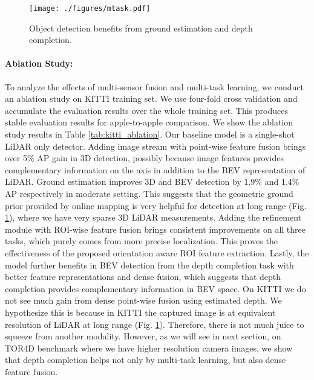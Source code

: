 \documentclass[10pt,twocolumn,letterpaper]{article}
\begin{document}
\begin{figure}[t]
\begin{center}
\texttt{[image: ./figures/mtask.pdf]}
\end{center}
   \caption{Object detection benefits from ground estimation and depth completion.}
\label{fig:mtask}
\end{figure}


\paragraph{Ablation Study:}
To analyze the effects of multi-sensor fusion and multi-task learning, we conduct an ablation study on KITTI training set. We use four-fold cross validation and accumulate the evaluation results over the whole training set. This produces stable evaluation results for apple-to-apple comparison. We show the ablation study results in Table \ref{tab:kitti_ablation}.
Our baseline model is a single-shot LiDAR only detector. Adding image stream with point-wise feature fusion brings over 5\% AP gain in 3D detection, possibly because image features provides complementary information on the  axis in addition to the BEV representation of LiDAR. 
Ground estimation improves 3D and BEV detection by 1.9\% and 1.4\% AP respectively in moderate setting. This suggests that the geometric ground prior provided by online mapping is very helpful for detection at long range (Fig. \ref{fig:mtask}), where we have very sparse 3D LiDAR measurements. 
Adding the refinement module with ROI-wise feature fusion brings consistent improvements on all three tasks, which purely comes from more precise localization. This proves the effectiveness of the proposed orientation aware ROI feature extraction. 
Lastly, the model further benefits in BEV detection from the depth completion task with better feature representations and dense fusion, which suggests that depth completion provides  complementary information in BEV space. On KITTI we do not see much gain from dense point-wise fusion using estimated depth. We hypothesize  this is   because in KITTI the captured image is at equivalent resolution of LiDAR at long range (Fig. \ref{fig:mtask}).  Therefore, there is not much juice to squeeze from another modality. However, as we will see in next section, on TOR4D benchmark where we have higher resolution camera images, we show that depth completion helps not only by multi-task learning, but also dense feature fusion.
\end{document}
